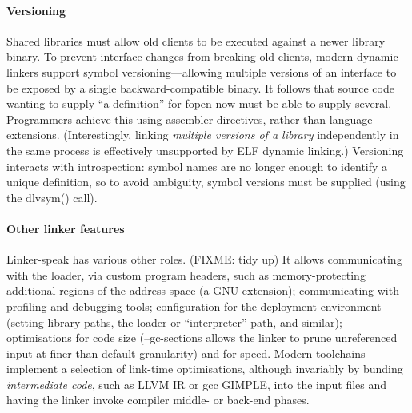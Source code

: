 
\paragraph{Versioning} 
Shared libraries must allow old clients to be executed against a newer
library binary.
To prevent interface changes from breaking old clients, 
modern dynamic linkers support symbol versioning---allowing
multiple versions of an interface to be exposed by a single
backward-compatible binary.
It follows that source code wanting to supply ``a definition''
for \textsf{fopen} now must be able to supply several.
Programmers achieve this using assembler directives, 
rather than language extensions.
(Interestingly, linking \emph{multiple versions of a library} independently
in the same process is effectively unsupported by ELF dynamic linking.)
Versioning interacts with introspection: symbol names
are no longer enough to identify a unique definition,
so to avoid ambiguity, symbol versions must be supplied (using the \textsf{dlvsym()} call).

\paragraph{Other linker features}
Linker-speak has various other roles. (FIXME: tidy up)
It allows communicating with the loader, via custom program headers,
such as memory-protecting additional regions of the address space
(a GNU extension); 
communicating with profiling and debugging tools; 
configuration for the deployment environment 
(setting library paths, the loader or ``interpreter'' path, and similar); 
optimisations for code size 
(\textsf{--gc-sections} allows the linker to prune unreferenced input 
at finer-than-default granularity)
and for speed.
Modern toolchains implement a selection of link-time optimisations, 
although invariably by bunding \emph{intermediate code}, 
such as LLVM IR or \textsf{gcc} GIMPLE, 
into the input files and having the linker invoke compiler middle- or back-end phases.


